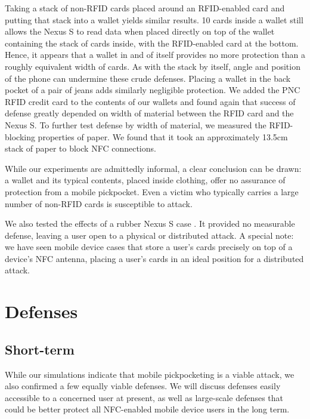 \documentclass{sig-alternate}
\begin{document}
Taking a stack of non-RFID cards placed around an RFID-enabled card and putting that stack into a wallet yields similar results.  10 cards inside a wallet still allows the Nexus S to read data when placed directly on top of the wallet containing the stack of cards inside, with the RFID-enabled card at the bottom.  Hence, it appears that a wallet in and of itself provides no more protection than a roughly equivalent width of cards.  As with the stack by itself, angle and position of the phone can undermine these crude defenses. Placing a wallet in the back pocket of a pair of jeans adds similarly negligible protection. We added the PNC RFID credit card to the contents of our wallets and found again that success of defense greatly depended on width of material between the RFID card and the Nexus S.  To further test defense by width of material, we measured the RFID-blocking properties of paper.  We found that it took an approximately 13.5cm stack of paper to block NFC connections.

While our experiments are admittedly informal, a clear conclusion can be drawn:  a wallet and its typical contents, placed inside clothing, offer no assurance of protection from a mobile pickpocket.  Even a victim who typically carries a large number of non-RFID cards is susceptible to attack.

We also tested the effects of a rubber Nexus S case \cite{ebay-epik-nexus-s-case}.  It provided no measurable defense, leaving a user open to a physical or distributed attack.  A special note:  we have seen mobile device cases \cite{ebay-fluffy-nexus-s-case} that store a user's cards precisely on top of a device's NFC antenna, placing a user's cards in an ideal position for a distributed attack.

\section{Defenses}
\subsection{Short-term}
While our simulations indicate that mobile pickpocketing is a viable attack, we also confirmed a few equally viable defenses.  We will discuss defenses easily accessible to a concerned user at present, as well as large-scale defenses that could be better protect all NFC-enabled mobile device users in the long term.
\end{document}
